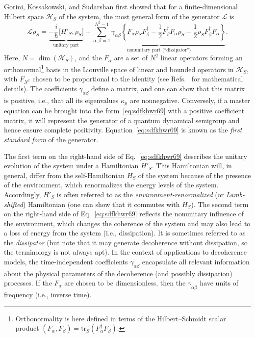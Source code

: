 \documentclass[3p,sort&compress]{elsarticle}
\newcommand{\I}{\ensuremath{i}}
\newcommand{\op}[1]{#1}
\begin{document}
Gorini, Kossakowski, and Sudarshan \cite{Gorini:1976:tt} first showed that for a finite-dimensional Hilbert space $\mathcal{H}_S$ of the system, the most general form of the generator $\mathcal{L}$ is \cite{Breuer:2002:oq,Alicki:2007:uu}
%
\begin{equation}
  \label{eq:sdfkhwr69}
\mathcal{L}\op{\rho}_S = \underbrace{-\frac{\I}{\hbar} \bigl[
  \op{H}'_S, \op{\rho}_S \bigr]}_{\text{unitary part}} + \underbrace{\sum_{\alpha,\beta=1}^{N^2-1} \gamma_{\alpha\beta} \left\{
\op{F}_\alpha \op{\rho}_S \op{F}^\dagger_\beta - \frac{1}{2} \op{F}^\dagger_\beta\op{F}_\alpha \op{\rho}_S
- \frac{1}{2} \op{\rho}_S\op{F}^\dagger_\beta\op{F}_\alpha \right\}}_{\text{nonunitary part (``dissipator'')}}.
\end{equation}
%
Here, $N=\dim(\mathcal{H}_S)$, and the $\op{F}_\alpha$ are a set of $N^2$ linear operators forming an orthonormal\footnote{Orthonormality is here defined in terms of the Hilbert--Schmidt scalar product $(\op{F}_\alpha, \op{F}_\beta) = \text{tr}_S (\op{F}_\alpha^\dagger \op{F}_\beta)$.}  basis in the Liouville space of linear and bounded operators in $\mathcal{H}_S$, with $\op{F}_{N^2}$ chosen to be proportional to the identity (see Refs.~\cite{Breuer:2002:oq,Alicki:2007:uu} for mathematical details). The coefficients $\gamma_{\alpha\beta}$ define a matrix, and one can show that this matrix is positive, i.e., that all its eigenvalues $\kappa_\mu$ are nonnegative. Conversely, if a master equation can be brought into the form~\eqref{eq:sdfkhwr69} with a positive coefficient matrix, it will represent the generator of a quantum dynamical semigroup and hence ensure complete positivity. Equation~\eqref{eq:sdfkhwr69} is known as the \emph{first standard form} of the generator. 

The first term on the right-hand side of Eq.~\eqref{eq:sdfkhwr69} describes the unitary evolution of the system under a Hamiltonian $\op{H}'_S$. This Hamiltonian will, in general, differ from the self-Hamiltonian $\op{H}_S$ of the system because of the presence of the environment, which renormalizes the energy levels of the system. Accordingly, $\op{H}'_S$ is often referred to as the \emph{environment-renormalized} (or \emph{Lamb-shifted}) Hamiltonian (one can show that it commutes with $\op{H}_S$).  The second term on the right-hand side of Eq.~\eqref{eq:sdfkhwr69} reflects the nonunitary influence of the environment, which changes the coherence of the system and may also lead to a loss of energy from the system (i.e., dissipation). It is sometimes referred to as the \emph{dissipator} \cite{Breuer:2002:oq} (but note that it may generate decoherence without dissipation, so the terminology is not always apt). In the context of applications to decoherence models, the time-independent coefficients $\gamma_{\alpha\beta}$ encapsulate all relevant information about the physical parameters of the decoherence (and possibly dissipation) processes. If the $\op{F}_\alpha$ are chosen to be dimensionless, then the $\gamma_{\alpha\beta}$ have units of frequency (i.e., inverse time).
\end{document}
